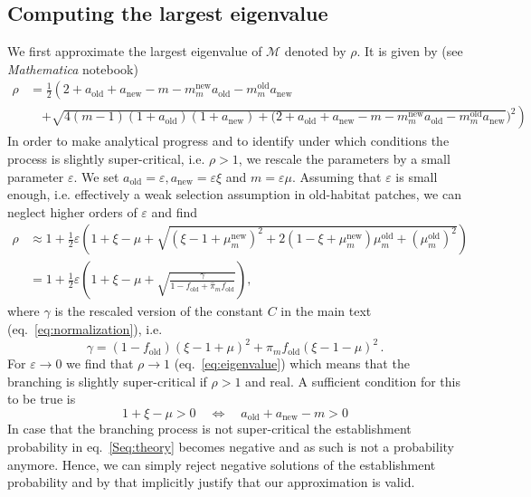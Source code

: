 \documentclass[11pt]{article}
\newcommand{\chg}[1]{\textcolor{change}{#1}}
\begin{document}
\subsection*{Computing the largest eigenvalue}
We first approximate the largest eigenvalue of $\mathcal{M}$ denoted by $\rho$. It is given by (see \textit{Mathematica} notebook)
\begin{equation}
\begin{aligned}
\rho &= \frac{1}{2}\left(2 + a_{\text{old}} + a_{\text{new}} - m -  m_m^{\text{new}} a_{\text{old}} - m_m^{\text{old}} a_{\text{new}} \right.\\
&\quad \left. + \sqrt{4 (m -1) (1+a_{\text{old}})(1+a_{\text{new}}) + (2+a_{\text{old}} + a_{\text{new}} - m - m_m^{\text{new}} a_{\text{old}} - m_m^{\text{old}} a_{\text{new}}})^2 \right)
\end{aligned}
\end{equation}
%
In order to make analytical progress and to identify under which conditions the process is slightly super-critical, i.e. $\rho>1$, we rescale the parameters by a small parameter $\varepsilon$. We set $a_{\text{old}} = \varepsilon, a_{\text{new}} = \varepsilon \xi$ and $m = \varepsilon\mu$. Assuming that $\varepsilon$ is small enough, i.e. effectively a weak selection assumption in old-habitat patches, we can neglect higher orders of $\varepsilon$ and find
\begin{equation}\label{eq:eigenvalue}
\begin{aligned}
\rho &\approx 1+\frac{1}{2}\varepsilon\left(1+ \xi - \mu + \sqrt{(\xi -1 + \mu_m^{\text{new}})^2 + 2(1-\xi+\mu_m^{\text{new}})\mu_m^{\text{old}} + (\mu_m^{\text{old}})^2  }\right)\\
&= 1+\frac{1}{2}\varepsilon\left(1+ \xi - \mu + \sqrt{\frac{\gamma}{1-f_{\text{old}}+\widehat{\pi}_m f_{\text{old}}}  }\right),
\end{aligned}
\end{equation}
where $\gamma$ is the rescaled version of the constant $C$ in the main text (eq.~\eqref{eq:normalization}), i.e.
\begin{equation}
\gamma = (1-f_{\text{old}})(\xi-1+\mu)^2 + \widehat{\pi}_m f_{\text{old}} (\xi-1-\mu)^2\, .
\end{equation}
%
For $\varepsilon\to 0$ we find that $\rho\to 1$ \chg{(eq.~\eqref{eq:eigenvalue}) which means that the branching is slightly super-critical if $\rho>1$ and real. A sufficient condition for this to be true is}
\begin{equation}
1+\xi-\mu > 0 \quad \Leftrightarrow \quad a_{\text{old}} + a_{\text{new}} - m > 0
\end{equation}
%
\chg{In case that the branching process is not super-critical the establishment probability in eq.~\eqref{Seq:theory} becomes negative and as such is not a probability anymore. Hence, we can simply reject negative solutions of the establishment probability and by that implicitly justify that our approximation is valid.}%
\end{document}
